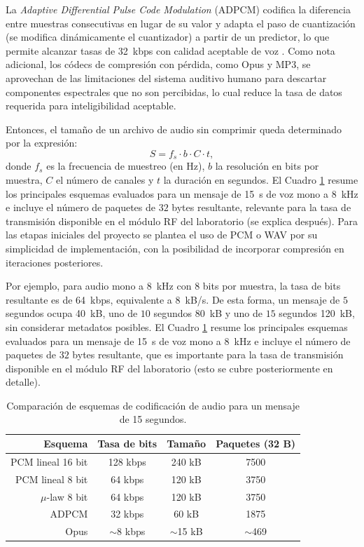 La \textit{Adaptive Differential Pulse Code Modulation} (ADPCM) codifica la diferencia entre muestras consecutivas en lugar de su valor y adapta el paso de cuantización (se modifica dinámicamente el cuantizador) a partir de un predictor, lo que permite alcanzar tasas de \SI{32}{\kilo bps} con calidad aceptable de voz \cite{pohlmann2005, li2014}.
Como nota adicional, los códecs de compresión con pérdida, como Opus y MP3, se aprovechan de las limitaciones del sistema auditivo humano para descartar componentes espectrales que no son percibidas, lo cual reduce la tasa de datos requerida para inteligibilidad aceptable.

Entonces, el tamaño de un archivo de audio sin comprimir queda determinado por la expresión:
\begin{equation}
    S = f_s \cdot b \cdot C \cdot t,
\end{equation}
donde $f_s$ es la frecuencia de muestreo (en \si{\hertz}), $b$ la resolución en bits por muestra, $C$ el número de canales y $t$ la duración en segundos.
El Cuadro \ref{tab:esquemas} resume los principales esquemas evaluados para un mensaje de \SI{15}{\second} de voz mono a \SI{8}{\kilo\hertz} e incluye el número de paquetes de $32$ bytes resultante, relevante para la tasa de transmisión disponible en el módulo RF del laboratorio (se explica después).
Para las etapas iniciales del proyecto se plantea el uso de PCM o WAV por su simplicidad de implementación, con la posibilidad de incorporar compresión en iteraciones posteriores.

Por ejemplo, para audio mono a \SI{8}{\kilo\hertz} con $8$ bits por muestra, la tasa de bits resultante es de \SI{64}{kbps}, equivalente a \SI{8}{kB/s}.
De esta forma, un mensaje de $5$ segundos ocupa \SI{40}{kB}, uno de $10$ segundos \SI{80}{kB} y uno de $15$ segundos \SI{120}{kB}, sin considerar metadatos posibles.
El Cuadro \ref{tab:esquemas} resume los principales esquemas evaluados para un mensaje de \SI{15}{\second} de voz mono a \SI{8}{\kilo\hertz} e incluye el número de paquetes de $32$ bytes resultante, que es importante para la tasa de transmisión disponible en el módulo RF del laboratorio (esto se cubre posteriormente en detalle).

\begin{table}[h]
    \centering
    \caption{Comparación de esquemas de codificación de audio para un mensaje de 15 segundos.}
    \label{tab:esquemas}
    \begin{tabular}{@{}rccc@{}}
        \toprule
        Esquema & Tasa de bits & Tamaño & Paquetes (32 B) \\
        \midrule
        PCM lineal 16 bit   & 128 kbps     & 240 kB      & 7500 \\
        PCM lineal 8 bit    & 64 kbps      & 120 kB      & 3750 \\
        $\mu$-law 8 bit     & 64 kbps      & 120 kB      & 3750 \\
        ADPCM               & 32 kbps      & 60 kB       & 1875 \\
        Opus                & $\sim$8 kbps & $\sim$15 kB & $\sim$469  \\
        \bottomrule
    \end{tabular}
\end{table}

